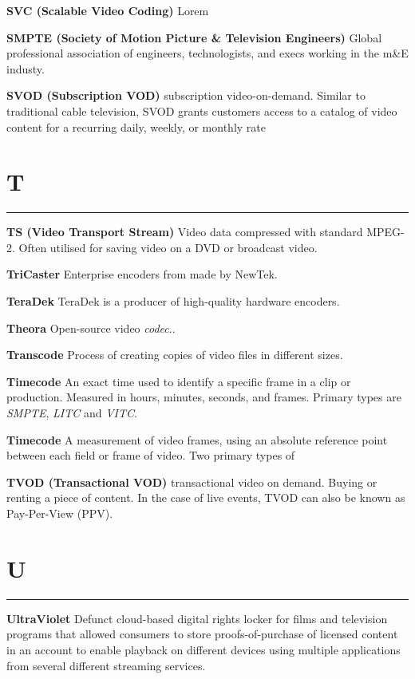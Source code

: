 \smallskip
\textbf{SVC (Scalable Video Coding)}
Lorem

\smallskip
\textbf{SMPTE (Society of Motion Picture \& Television Engineers)}
Global professional association of engineers, technologists, and execs working in the m\&E industy.

\smallskip
\textbf{SVOD (Subscription VOD)}
subscription video-on-demand. Similar to traditional cable television, SVOD grants customers access to a catalog of video content for a recurring daily, weekly, or monthly rate


\section{T}
\hrule

\medskip
\textbf{TS (Video Transport Stream)}
Video data compressed with standard MPEG-2. Often utilised for saving video on a DVD or broadcast video.


\smallskip
\textbf{TriCaster}
Enterprise encoders from made by NewTek.

\smallskip
\textbf{TeraDek}
TeraDek is a producer of high-quality hardware encoders.


\smallskip
\textbf{Theora}
Open-source video \textit{codec}..

\smallskip
\textbf{Transcode}
Process of creating copies of video files in different sizes.

\smallskip
\textbf{Timecode}
An exact time used to identify a specific frame in a clip or production. Measured in hours, minutes, seconds, and frames. Primary types are \textit{SMPTE}, \textit{LITC} and \textit{VITC}.

\smallskip
\textbf{Timecode}
A measurement of video frames, using an absolute reference point between each field or frame of video. Two primary types of

\smallskip
\textbf{TVOD (Transactional VOD)}
transactional video on demand. Buying or renting a piece of content. In the case of live events, TVOD can also be known as Pay-Per-View (PPV).


\section{U}
\hrule

\medskip
\textbf{UltraViolet}
Defunct cloud-based digital rights locker for films and television programs that allowed consumers to store proofs-of-purchase of licensed content in an account to enable playback on different devices using multiple applications from several different streaming services.

